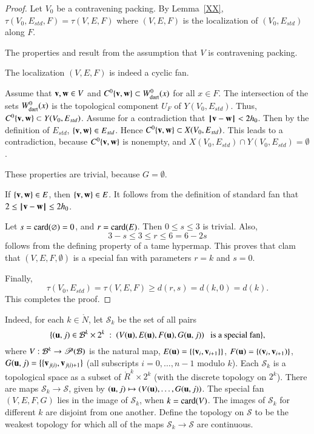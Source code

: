 \begin{proof}
Let $V_0$ be a contravening packing.
By Lemma~\ref{XX}, $\tau(V_0,E_{std},F)=\tau(V,E,F)$  where $(V,E,F)$ is the
localization of
$(V_0,E_{std})$ along $F$. 

  The properties  and
 result from the assumption that $V$ is contravening
packing.  

  The localization $(V,E,F)$ is indeed a cyclic fan.

  Assume that ${\mathbf v},{\mathbf w}\in V$ and 
$C^0\{{\mathbf v},{\mathbf w}\}\subset W^0_{\text{dart}}(x)$ for all $x\in F$.
The intersection of the sets $W^0_{\text{dart}}(x)$ is the topological component
$U_F$ of $Y(V_0,E_{std})$.  Thus, $C^0\{{\mathbf v},{\mathbf w}\}\subset Y(V_0,E_{std})$.
Assume for a contradiction that ${\hskip0.1em|\hskip-0.15em|\hskip0.1em}{\mathbf v} - {\mathbf w}{\hskip0.1em|\hskip-0.15em|\hskip0.1em}< 2{h_0}$. Then by the definition of $E_{std}$, $\{{\mathbf v},{\mathbf w}\}\in E_{std}$.
Hence $C^0\{{\mathbf v},{\mathbf w}\}\subset X(V_0,E_{std})$. This leads to a contradiction, because
$C^0\{{\mathbf v},{\mathbf w}\}$ is nonempty, and $X(V_0,E_{std})\cap Y(V_0,E_{std})=\emptyset$.

   These properties are trivial, because $G=\emptyset$.

 If $\{{\mathbf v},{\mathbf w}\}\in E$, then $\{{\mathbf v},{\mathbf w}\}\in E$.  It follows from the definition of
standard fan that $2\le {\hskip0.1em|\hskip-0.15em|\hskip0.1em}{\mathbf v} - {\mathbf w}{\hskip0.1em|\hskip-0.15em|\hskip0.1em}\le 2{h_0}$.

 Let $s={\operatorname{card}}(\varnothing) = 0$, and $r={\operatorname{card}}(E)$.  Then $0\le s\le 3$ is trivial. Also, 
$$3-s \le 3\le r \le 6=6 - 2s$$
follows from the defining property  of a tame hypermap.  This proves that clam that
$(V,E,F,\emptyset)$ is a special fan with parameters $r=k$ and $s=0$.

Finally, 
$$\tau(V_0,E_{std})=\tau(V,E,F) \ge d(r,s) = d(k,0) = d(k).$$  
This completes the proof.
\end{proof}

Indeed, for each $k\in\ring{N}$,  let ${\mathcal S}_k$ be the set of all pairs 
$$\{({\mathbf u},j) \in{\mathcal B}^k\times 2^k \ :\  (V({\mathbf u}),E({\mathbf u}),F({\mathbf u}),G({\mathbf u},j)) \text{~~ is a special fan}\},$$
where $V:{\mathcal B}^k\to {\mathscr P}({\mathcal B})$ is the natural map, $E({\mathbf u}) = \{\{{\mathbf v}_i,{\mathbf v}_{i+1}\}\}$,
$F({\mathbf u}) = \{({\mathbf v}_i,{\mathbf v}_{i+1})\}$, $G({\mathbf u},j) = \{\{{\mathbf v}_{j(i)},{\mathbf v}_{j(i)+1}\}$ (all subscripts $i=0,\ldots,n-1$ modulo $k$).  Each ${\mathcal S}_k$ is
a topological space as a subset of $\ring{R}^k\times 2^k$ (with the discrete topology on $2^k$).  There are maps ${\mathcal S}_k\to{\mathcal S}$, given by
$({\mathbf u},j)\mapsto (V({\mathbf u}),\ldots,G({\mathbf u},j))$.
The special fan $(V,E,F,G)$ lies in the image of ${\mathcal S}_k$, when
$k = {\operatorname{card}}(V)$.  The images of ${\mathcal S}_k$ for different $k$ are disjoint
from one another.  Define the topology on ${\mathcal S}$ to be the weakest topology for which all of the maps ${\mathcal S}_k\to {\mathcal S}$ are
continuous.


